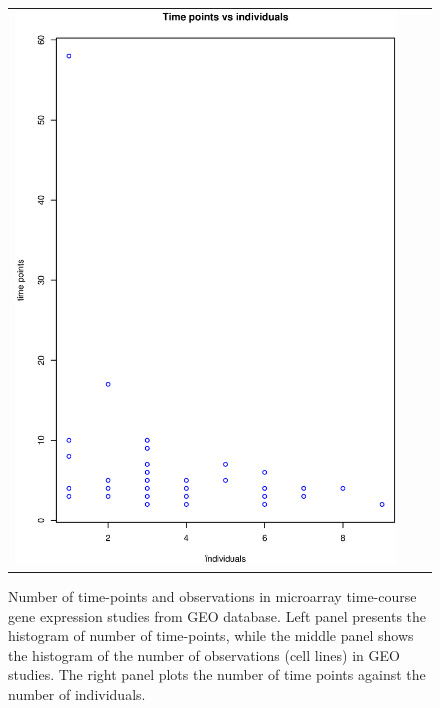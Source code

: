 \documentclass[a4paper]{article}
\begin{document}
\begin{figure}[h!]
\begin{tabular}{ccc}
\includegraphics[scale=0.24]{GEOscat.eps}\\
\end{tabular}
\caption{Number of time-points and observations in microarray time-course gene expression studies from GEO database. Left panel presents the histogram of number of time-points, while the middle panel shows the histogram of the number of observations (cell lines) in GEO studies. The right panel plots the number of time points against the number of individuals.}
\label{figSM:GEOhist}
\end{figure}



\end{document}
